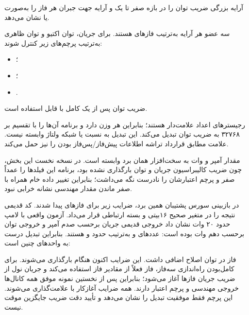 آرایه  بزرگی ضریب توان را در بازه صفر تا یک و آرایه  جهت جبران  هر فاز را به‌صورت  یا  نشان می‌دهد.

سه عضو هر آرایه به‌ترتیب فازهای  هستند. برای جریان، توان اکتیو و توان ظاهری به‌ترتیب پرچم‌های زیر کنترل شوند:

\begin{itemize}
  \item {}؛
  \item {}؛
  \item {}.
\end{itemize}

ضریب توان پس از یک  کامل با  قابل استفاده است.

رجیسترهای
اعداد علامت‌دار  هستند؛ بنابراین هر  وزن
دارد و برنامه آن‌ها را با تقسیم بر ۳۲۷۶۸ به ضریب توان تبدیل می‌کند. این تبدیل به نسبت  یا شبکه ولتاژ وابسته نیست. علامت  مطابق قرارداد تراشه اطلاعات پیش‌فاز/پس‌فاز بودن را نیز حمل می‌کند.

مقدار آمپر و وات به سخت‌افزار همان برد وابسته است. در نسخه نخست این بخش، چون ضریب کالیبراسیون جریان و توان بارگذاری نشده بود، برنامه این فیلدها را عمداً صفر و پرچم اعتبارشان را نادرست نگه می‌داشت؛ بنابراین تغییر داده خام همراه با صفر ماندن مقدار مهندسی نشانه خرابی  نبود.

در بازبینی سورس پشتیبان همین برد، ضرایب زیر برای فازهای  پیدا شدند. کد قدیمی نتیجه را در متغیر صحیح ۱۶بیتی و بسته ارتباطی قرار می‌داد. آزمون واقعی با لامپ حدود ۲۰ وات نشان داد خروجی قدیمی جریان برحسب صدم آمپر و خروجی توان برحسب دهم وات بوده است: عددهای  و  به‌ترتیب حدود  و  هستند. بنابراین تبدیل درست به واحدهای  چنین است:

\begin{center}

\end{center}

فاز  در توان اصلاح اضافی  داشت. این ضرایب اکنون هنگام
بارگذاری می‌شوند. برای کامل‌بودن راه‌اندازی سه‌فاز، فاز  فعلاً از مقادیر فاز  استفاده می‌کند و جریان نول از ضریب جریان فازها آغاز می‌شود؛ بنابراین پس از نخستین نمونه موفق همه کانال‌ها خروجی مهندسی و پرچم اعتبار دارند. همه ضرایب آغازکار با
علامت‌گذاری می‌شوند. این پرچم فقط موفقیت تبدیل را نشان می‌دهد و تأیید دقت ضریب جایگزین موقت نیست.

